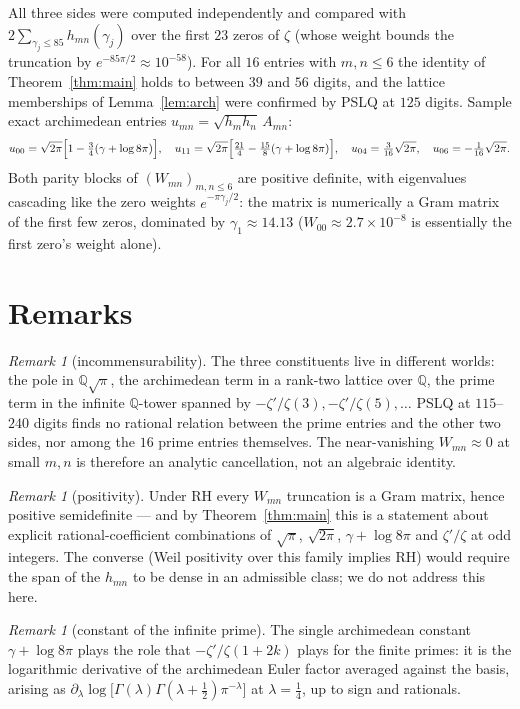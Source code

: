 \documentclass[11pt,a4paper]{article}
\theoremstyle{remark}
\newtheorem{remark}[theorem]{Remark}
\newcommand{\Q}{\mathbb{Q}}
\newcommand{\G}{\Gamma}
\begin{document}
All three sides were computed independently and compared with
$2\sum_{\gamma_j\le 85} h_{mn}(\gamma_j)$ over the first $23$
zeros of $\zeta$ (whose weight bounds the truncation by
$e^{-85\pi/2}\approx10^{-58}$).  For all $16$ entries with
$m,n\le6$ the identity of Theorem~\ref{thm:main} holds to between
$39$ and $56$ digits, and the lattice memberships of
Lemma~\ref{lem:arch} were confirmed by PSLQ at $125$ digits.
Sample exact archimedean entries
$u_{mn}=\sqrt{h_mh_n}\,A_{mn}$:
\[
u_{00}=\sqrt{2\pi}\Bigl[1-\tfrac34(\gamma+\log8\pi)\Bigr],\quad
u_{11}=\sqrt{2\pi}\Bigl[\tfrac{21}4-\tfrac{15}8(\gamma+\log8\pi)\Bigr],\quad
u_{04}=\tfrac3{16}\sqrt{2\pi},\quad
u_{06}=-\tfrac1{16}\sqrt{2\pi}.
\]
Both parity blocks of $(W_{mn})_{m,n\le6}$ are positive
definite, with eigenvalues cascading like the zero weights
$e^{-\pi\gamma_j/2}$: the matrix is numerically a Gram matrix of
the first few zeros, dominated by $\gamma_1\approx14.13$
($W_{00}\approx 2.7\times10^{-8}$ is essentially the first
zero's weight alone).

\section{Remarks}

\begin{remark}[incommensurability]
The three constituents live in different worlds: the pole in
$\Q\sqrt\pi$, the archimedean term in a rank-two lattice over
$\Q$, the prime term in the infinite $\Q$-tower spanned by
$-\zeta'/\zeta(3), -\zeta'/\zeta(5),\dots$  PSLQ at $115$--$240$
digits finds no rational relation between the prime entries and
the other two sides, nor among the $16$ prime entries themselves.
The near-vanishing $W_{mn}\approx0$ at small $m,n$ is therefore
an analytic cancellation, not an algebraic identity.
\end{remark}

\begin{remark}[positivity]
Under RH every $W_{mn}$ truncation is a Gram matrix, hence
positive semidefinite --- and by Theorem~\ref{thm:main} this is a
statement about explicit rational-coefficient combinations of
$\sqrt\pi$, $\sqrt{2\pi}$, $\gamma+\log8\pi$ and
$\zeta'/\zeta$ at odd integers.  The converse (Weil positivity
over this family implies RH) would require the span of the
$h_{mn}$ to be dense in an admissible class; we do not address
this here.
\end{remark}

\begin{remark}[constant of the infinite prime]
The single archimedean constant $\gamma+\log8\pi$ plays the role
that $-\zeta'/\zeta(1+2k)$ plays for the finite primes: it is the
logarithmic derivative of the archimedean Euler factor averaged
against the basis, arising as
$\partial_\lambda\log\bigl[\G(\lambda)\G(\lambda+\tfrac12)
\pi^{-\lambda}\bigr]$ at $\lambda=\tfrac14$, up to sign and
rationals.
\end{remark}
\end{document}
